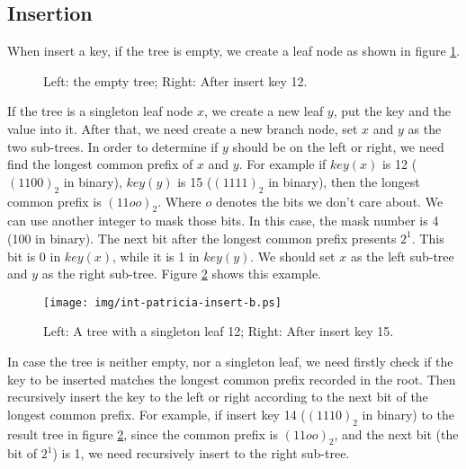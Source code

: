 \documentclass{article}
\begin{document}
\subsection{Insertion}
When insert a key, if the tree is empty, we create a leaf node as shown in figure
\ref{fig:int-patricia-insert-a}.

\begin{figure}[htbp]
  \centering
  \caption{Left: the empty tree; Right: After insert key 12.}
  \label{fig:int-patricia-insert-a}
\end{figure}

If the tree is a singleton leaf node $x$, we create a new leaf $y$,
put the key and the value into it. After that, we need create a new branch
node, set $x$ and $y$ as the two sub-trees.
In order to determine if $y$ should be on the left or right, we need
find the longest common prefix of $x$ and $y$. For example if $key(x)$
is 12 ($(1100)_2$ in binary), $key(y)$ is 15 ($(1111)_2$ in binary), then the longest
common prefix is $(11oo)_2$. Where $o$ denotes the bits we don't care about.
We can use another integer to mask those bits.
In this case, the mask number is 4 (100 in binary).
The next bit after the longest common prefix presents $2^1$. This bit is
0 in $key(x)$, while it is 1 in $key(y)$. We should set $x$ as the left
sub-tree and $y$ as the right sub-tree. Figure \ref{fig:int-patricia-insert-b}
shows this example.

\begin{figure}[htbp]
  \centering
  \texttt{[image: img/int-patricia-insert-b.ps]}
  \caption{Left: A tree with a singleton leaf 12; Right: After insert key 15.}
  \label{fig:int-patricia-insert-b}
\end{figure}

In case the tree is neither empty, nor a singleton leaf, we need
firstly check if the key to be inserted matches the longest common
prefix recorded in the root.
Then recursively insert the key to the left or right
according to the next bit of the longest common prefix.
For example, if insert key 14 ($(1110)_2$ in binary) to the result tree
in figure \ref{fig:int-patricia-insert-b}, since the common prefix is
$(11oo)_2$, and the next bit (the bit of $2^1$) is 1, we need recursively
insert to the right sub-tree.
\end{document}
